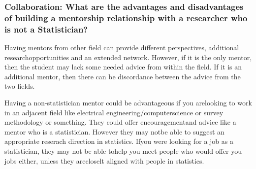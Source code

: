 \documentclass{beamer}
\begin{document}
\begin{frame} %
  \frametitle{Collaboration: What are the advantages and disadvantages of building a mentorship relationship with a researcher who is not a Statistician?}
  
  Having mentors from other field can provide different perspectives, additional researchopportunities and an extended network.  However,  if it is the only mentor,  then the student  may  lack  some  needed  advice  from  within  the  field.   If  it  is  an  additional mentor, then there can be discordance between the advice from the two fields.

  \medskip

  Having  a  non-statistician  mentor  could  be  advantageous  if  you  arelooking to work in an adjacent field like electrical engineering/computerscience or survey methodology or something. They could offer encouragementand advice like a mentor who is a statistician.  However they may notbe  able  to  suggest  an  appropriate  reserach  direction  in  statistics.   Ifyou were looking for a job as a statistician, they may not be able tohelp you meet people who would offer you jobs either, unless they arecloselt aligned with people in statistics.









\end{frame}
\end{document}
